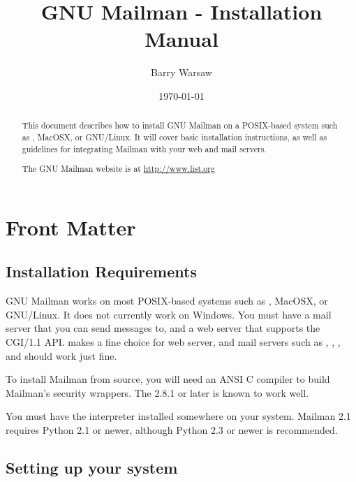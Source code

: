 \documentclass{howto}
\title{GNU Mailman - Installation Manual}
\author{Barry Warsaw}
\date{\today}
\begin{document}
\maketitle

%
\ifhtml
\chapter*{Front Matter\label{front}}
\fi

\begin{abstract}
\noindent
This document describes how to install GNU Mailman on a POSIX-based system
such as \UNIX{}, MacOSX, or GNU/Linux.  It will cover basic installation
instructions, as well as guidelines for integrating Mailman with your web and
mail servers.

The GNU Mailman website is at \url{http://www.list.org}
\end{abstract}

%
\tableofcontents


\section{Installation Requirements}

GNU Mailman works on most POSIX-based systems such as \UNIX{}, MacOSX, or
GNU/Linux.  It does not currently work on Windows.  You must have a mail
server that you can send messages to, and a web server that supports the
CGI/1.1 API.   makes a fine choice for
web server, and mail servers such as
,
,
, and
 should
work just fine.

To install Mailman from source, you will need an ANSI C compiler to build
Mailman's security wrappers.  The
 2.8.1 or later is known
to work well.

You must have the  interpreter installed
somewhere on your system.  Mailman 2.1 requires Python 2.1 or newer, although
Python 2.3 or newer is recommended.

\section{Setting up your system}
\end{document}
